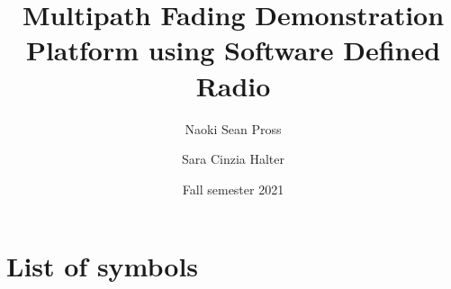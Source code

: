 \documentclass[
	overfullrule,
	paper = a4, twoside, openright, BCOR = 5mm,
	headinclude, footexclude,
	fontsize = 11pt,
	cleardoublepage = empty,
	titlepage, abstract = on,
	automark,
]{scrreprt}
\title{Multipath Fading Demonstration Platform using Software Defined Radio}
\author{Naoki Sean Pross \and Sara Cinzia Halter}
\date{Fall semester 2021}
\begin{document}
	\hypersetup{pageanchor = false}

	\maketitle

	\begin{abstract}
		\skelpar
	\end{abstract}

	\cleardoublepage
	\setcounter{page}{1}

	\tableofcontents
	\cleardoublepage

	\chapter*{List of symbols}
	\noindent %
\end{document}
